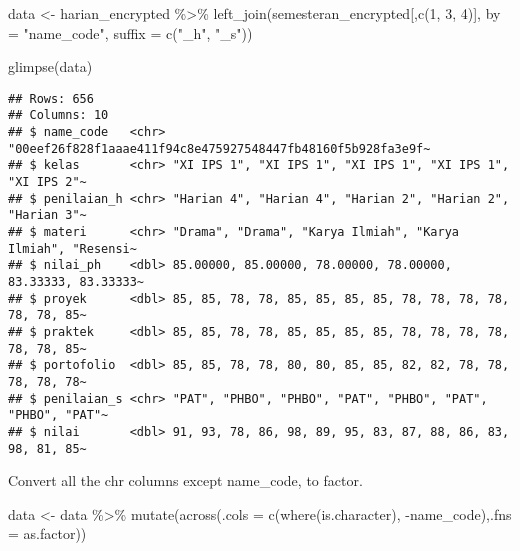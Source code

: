 \documentclass[
]{article}
\newenvironment{Shaded}{\begin{snugshade}}{\end{snugshade}}
\newcommand{\AttributeTok}[1]{\textcolor[rgb]{0.77,0.63,0.00}{#1}}
\newcommand{\DecValTok}[1]{\textcolor[rgb]{0.00,0.00,0.81}{#1}}
\newcommand{\FunctionTok}[1]{\textcolor[rgb]{0.00,0.00,0.00}{#1}}
\newcommand{\NormalTok}[1]{#1}
\newcommand{\OtherTok}[1]{\textcolor[rgb]{0.56,0.35,0.01}{#1}}
\newcommand{\SpecialCharTok}[1]{\textcolor[rgb]{0.00,0.00,0.00}{#1}}
\newcommand{\StringTok}[1]{\textcolor[rgb]{0.31,0.60,0.02}{#1}}
\begin{document}
\begin{Shaded}
\begin{Highlighting}[]
\NormalTok{data }\OtherTok{\textless{}{-}}
\NormalTok{  harian\_encrypted }\SpecialCharTok{\%\textgreater{}\%} \FunctionTok{left\_join}\NormalTok{(semesteran\_encrypted[,}\FunctionTok{c}\NormalTok{(}\DecValTok{1}\NormalTok{, }\DecValTok{3}\NormalTok{, }\DecValTok{4}\NormalTok{)], }
                                 \AttributeTok{by =} \StringTok{"name\_code"}\NormalTok{,}
                                 \AttributeTok{suffix =} \FunctionTok{c}\NormalTok{(}\StringTok{"\_h"}\NormalTok{, }\StringTok{"\_s"}\NormalTok{))}
\end{Highlighting}
\end{Shaded}

\begin{Shaded}
\begin{Highlighting}[]
\FunctionTok{glimpse}\NormalTok{(data)}
\end{Highlighting}
\end{Shaded}

\begin{verbatim}
## Rows: 656
## Columns: 10
## $ name_code   <chr> "00eef26f828f1aaae411f94c8e475927548447fb48160f5b928fa3e9f~
## $ kelas       <chr> "XI IPS 1", "XI IPS 1", "XI IPS 1", "XI IPS 1", "XI IPS 2"~
## $ penilaian_h <chr> "Harian 4", "Harian 4", "Harian 2", "Harian 2", "Harian 3"~
## $ materi      <chr> "Drama", "Drama", "Karya Ilmiah", "Karya Ilmiah", "Resensi~
## $ nilai_ph    <dbl> 85.00000, 85.00000, 78.00000, 78.00000, 83.33333, 83.33333~
## $ proyek      <dbl> 85, 85, 78, 78, 85, 85, 85, 85, 78, 78, 78, 78, 78, 78, 85~
## $ praktek     <dbl> 85, 85, 78, 78, 85, 85, 85, 85, 78, 78, 78, 78, 78, 78, 85~
## $ portofolio  <dbl> 85, 85, 78, 78, 80, 80, 85, 85, 82, 82, 78, 78, 78, 78, 78~
## $ penilaian_s <chr> "PAT", "PHBO", "PHBO", "PAT", "PHBO", "PAT", "PHBO", "PAT"~
## $ nilai       <dbl> 91, 93, 78, 86, 98, 89, 95, 83, 87, 88, 86, 83, 98, 81, 85~
\end{verbatim}

Convert all the chr columns except name\_code, to factor.

\begin{Shaded}
\begin{Highlighting}[]
\NormalTok{data }\OtherTok{\textless{}{-}}\NormalTok{ data }\SpecialCharTok{\%\textgreater{}\%} 
  \FunctionTok{mutate}\NormalTok{(}\FunctionTok{across}\NormalTok{(}\AttributeTok{.cols =} \FunctionTok{c}\NormalTok{(}\FunctionTok{where}\NormalTok{(is.character), }\SpecialCharTok{{-}}\NormalTok{name\_code),}\AttributeTok{.fns =}\NormalTok{ as.factor))}
\end{Highlighting}
\end{Shaded}
\end{document}
